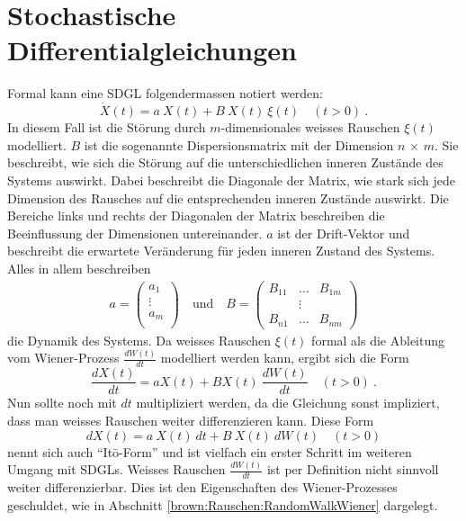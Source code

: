 %
%
%
%

\section{Stochastische Differentialgleichungen\label{brown:SDGL}}

Formal kann eine SDGL folgendermassen notiert werden: 
\begin{equation}
	\label{brown:SDGL:whiteNoise}
	\dot{X}(t) = a \ X(t) + B \ X(t) \ \xi(t) \quad (t>0) \ .
\end{equation}
In diesem Fall ist die Störung durch $ m $-dimensionales weisses Rauschen $ \xi(t) $ modelliert. $ B $ ist die sogenannte Dispersionsmatrix mit der Dimension $ n $ $\times $ $ m $. Sie beschreibt, wie sich die Störung auf die unterschiedlichen inneren Zustände des Systems auswirkt. Dabei beschreibt die Diagonale der Matrix, wie stark sich jede Dimension des Rausches auf die entsprechenden inneren Zustände auswirkt. Die Bereiche links und rechts der Diagonalen der Matrix beschreiben die Beeinflussung der Dimensionen untereinander. $ a $ ist der Drift-Vektor und beschreibt die erwartete Veränderung für jeden inneren Zustand des Systems. Alles in allem beschreiben
\begin{align*}
	a = 
	\begin{pmatrix}
		a_{1} \\
		\vdots \\
		a_{m}\\ 
	\end{pmatrix}
	\quad\text{und}\quad
	B = 
	\begin{pmatrix}
		B_{11} & \dots & B_{1m} \\
		& \vdots & \\
		B_{n1} & \dots & B_{nm} 
	\end{pmatrix}
\end{align*}
die Dynamik des Systems. Da weisses Rauschen $ \xi(t) $ formal als die Ableitung vom Wiener-Prozess $ \frac{dW(t)}{dt} $ modelliert werden kann, ergibt sich die Form
\begin{equation}
	\frac{dX(t)}{dt} = aX(t) + BX(t) \ \frac{dW(t)}{dt} \quad (t>0) \ .
\end{equation}
Nun sollte noch mit $ dt $  multipliziert werden, da die Gleichung sonst impliziert, dass man weisses Rauschen weiter differenzieren kann. Diese Form
\begin{equation}
	dX(t) = a \ X(t) \ dt + B \ X(t) \ dW(t) \quad (t>0)
\end{equation}
nennt sich auch ``Itō-Form'' und ist vielfach ein erster Schritt im weiteren Umgang mit SDGLs.
Weisses Rauschen $ \frac{dW(t)}{dt} $ ist per Definition nicht sinnvoll weiter differenzierbar. Dies ist den Eigenschaften des Wiener-Prozesses geschuldet, wie in Abschnitt \ref{brown:Rauschen:RandomWalkWiener} dargelegt.



